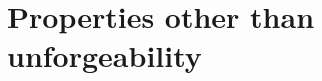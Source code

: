 \documentclass{mrl}
\theoremstyle{definition}
\numberwithin{theorem}{subsection}
\begin{document}



\section{Properties other than  unforgeability}\label{otherProperties}
\end{document}
